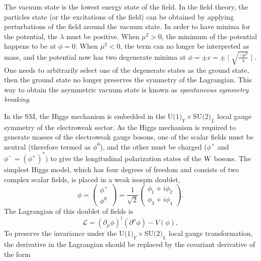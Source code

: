 The vacuum state is the lowest energy state of the field. In the field theory, the particles state (or the excitations of the field) can be obtained by applying perturbations of the field around the vacuum state. 
In order to have minima for the potential, the $\lambda$ must be positive. When $\mu^{2}>0$, the minimum of the potential happens to be at $\phi=0$. When $\mu^{2}<0$, the term can no longer be interpreted as mass, and the potential now has two degenerate minima at $\phi=\pm v=\pm \mid \sqrt{\frac{-\mu^{2}}{\lambda}} \mid$. 
One needs to arbitrarily select one of the degenerate states as the ground state, then the ground state no longer preserves the symmetry of the Lagrangian. This way to obtain the asymmetric vacuum state is known as \emph{spontaneous symmetry breaking}.

In the SM, the Higgs mechanism is embedded in the $\text{U(1)}_{Y}\times\text{SU(2)}_{L}$ local gauge symmetry of the electroweak sector.
As the Higgs mechanism is required to generate masses of the electroweak gauge bosons, one of the scalar fields must be neutral (therefore termed as $\phi^{0}$), and the other must be charged ($\phi^{+}$ and $\phi^{-}=(\phi^{+})^{\ast}$) to give the longitudinal polarization states of the $\mathrm{W}$ bosons\footnotemark.
The simplest Higgs model, which has four degrees of freedom and consists of two complex scalar fields, is placed in a weak isospin doublet, 
\begin{equation}
\label{eqn:HiggsModel}
\phi=\begin{pmatrix}
  \phi^{+} \\
  \phi^{0}  
 \end{pmatrix}
 =\frac{1}{\sqrt{2}}\begin{pmatrix}
  \phi_{1}+i\phi_{2} \\
  \phi_{3}+i\phi_{4}  
 \end{pmatrix}
 .
\end{equation}
The Lagrangian of this doublet of fields is 
\begin{equation}
\label{eqn:Lagrangian_Higgs}
\mathcal{L}=(\partial_{\mu}\phi)^{\dagger}(\partial^{\mu}\phi) - V(\phi),
\end{equation}
To preserve the invariance under the $\text{U(1)}_{Y}\times\text{SU(2)}_{L}$ local gauge transformation, the derivative in the Lagrangian should be replaced by the covariant derivative of the form
